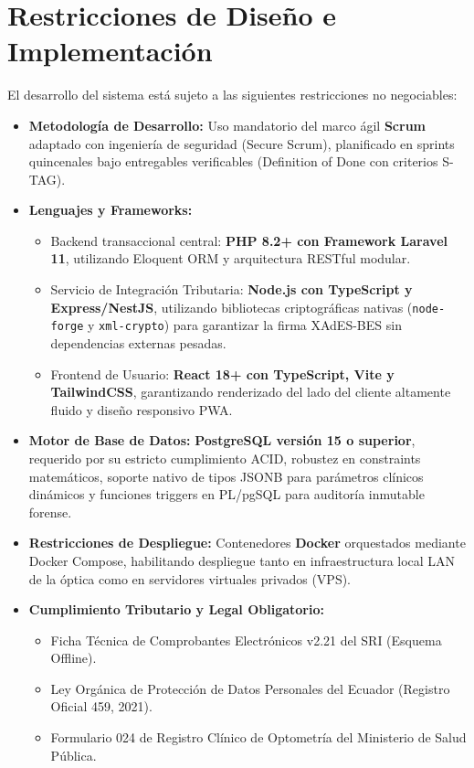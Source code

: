 \documentclass[12pt,a4paper]{report}
\begin{document}
\section{Restricciones de Diseño e Implementación}
El desarrollo del sistema está sujeto a las siguientes restricciones no negociables:
\begin{itemize}
    \item \textbf{Metodología de Desarrollo:} Uso mandatorio del marco ágil \textbf{Scrum} adaptado con ingeniería de seguridad (Secure Scrum), planificado en sprints quincenales bajo entregables verificables (Definition of Done con criterios S-TAG).
    \item \textbf{Lenguajes y Frameworks:}
        \begin{itemize}
            \item Backend transaccional central: \textbf{PHP 8.2+ con Framework Laravel 11}, utilizando Eloquent ORM y arquitectura RESTful modular.
            \item Servicio de Integración Tributaria: \textbf{Node.js con TypeScript y Express/NestJS}, utilizando bibliotecas criptográficas nativas (\texttt{node-forge} y \texttt{xml-crypto}) para garantizar la firma XAdES-BES sin dependencias externas pesadas.
            \item Frontend de Usuario: \textbf{React 18+ con TypeScript, Vite y TailwindCSS}, garantizando renderizado del lado del cliente altamente fluido y diseño responsivo PWA.
        \end{itemize}
    \item \textbf{Motor de Base de Datos:} \textbf{PostgreSQL versión 15 o superior}, requerido por su estricto cumplimiento ACID, robustez en constraints matemáticos, soporte nativo de tipos JSONB para parámetros clínicos dinámicos y funciones triggers en PL/pgSQL para auditoría inmutable forense.
    \item \textbf{Restricciones de Despliegue:} Contenedores \textbf{Docker} orquestados mediante Docker Compose, habilitando despliegue tanto en infraestructura local LAN de la óptica como en servidores virtuales privados (VPS).
    \item \textbf{Cumplimiento Tributario y Legal Obligatorio:}
        \begin{itemize}
            \item Ficha Técnica de Comprobantes Electrónicos v2.21 del SRI (Esquema Offline).
            \item Ley Orgánica de Protección de Datos Personales del Ecuador (Registro Oficial 459, 2021).
            \item Formulario 024 de Registro Clínico de Optometría del Ministerio de Salud Pública.
        \end{itemize}
\end{itemize}
\end{document}
